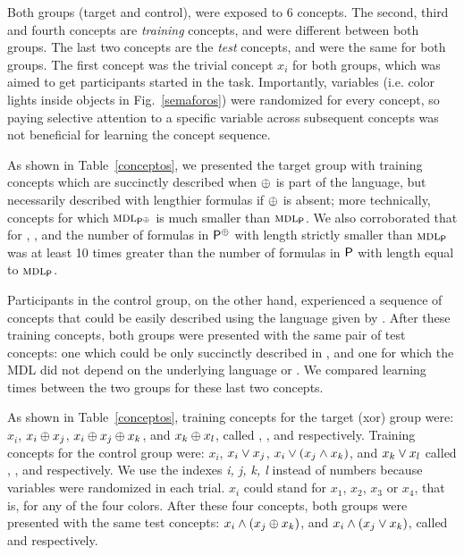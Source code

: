 Both groups (target and control), were exposed to 6 concepts. The second, third and fourth concepts are {\em training} concepts, and were different between both groups. The last two concepts are the {\em test} concepts, and were the same for both groups. The first concept was the trivial concept $x_i$ for both groups, which was aimed to get participants started in the task. Importantly, variables (i.e. color lights inside objects in Fig.~\ref{semaforos}) were randomized for every concept, so paying selective attention to a specific variable across subsequent concepts was not beneficial for learning the concept sequence.


As shown in Table~\ref{conceptos}, we presented the target group with training concepts which are succinctly described when $\oplus$ is part of the language, but necessarily described with lengthier formulas if $\oplus$ is absent; more technically, concepts for which $\textsc{mdl}_{{\sf P}^\oplus}$ is much smaller than $\textsc{mdl}_{{\sf P}}$. We also corroborated that for \targetb, \targetc, \targetd and \testa the number of formulas in ${\sf P}^\oplus$ with length strictly smaller than $\textsc{mdl}_{{\sf P}}$ was at least 10 times greater than the number of formulas in ${\sf P}$ with length equal to $\textsc{mdl}_{{\sf P}}$.

Participants in the control group, on the other hand, experienced a sequence of concepts that could be easily described using the language given by \grambool. After these training concepts, both groups were presented with the same pair of test concepts: one which could be only succinctly described in \gramboolxor, and one for which the MDL did not depend on the underlying language \gramboolxor or \grambool. We compared learning times between the two groups for these last two concepts.


As shown in Table~\ref{conceptos}, training concepts for the target (xor) group were: $x_{i}$, $x_{i} \oplus x_{j}$, $x_{i} \oplus x_{j} \oplus x_{k}$, and $x_{k} \oplus x_{l}$, called \targeta, \targetb, \targetc and \targetd respectively. Training concepts for the control group were: $x_{i}$, $x_{i} \vee x_{j}$, $x_{i} \vee (x_{j} \wedge x_{k})$, and $x_{k} \vee x_{l}$ called \controla, \controlb, \controlc and \controld respectively. We use the indexes \textit{i, j, k, l} instead of numbers because variables were randomized in each trial. $x_{i}$ could stand for $x_1$, $x_2$, $x_3$ or $x_4$, that is, for any of the four colors. After these four concepts, both groups were presented with the same test concepts: $x_{i} \wedge (x_{j} \oplus x_{k})$, and $x_{i} \wedge (x_{j} \vee x_{k})$, called \testa and \testb respectively.

